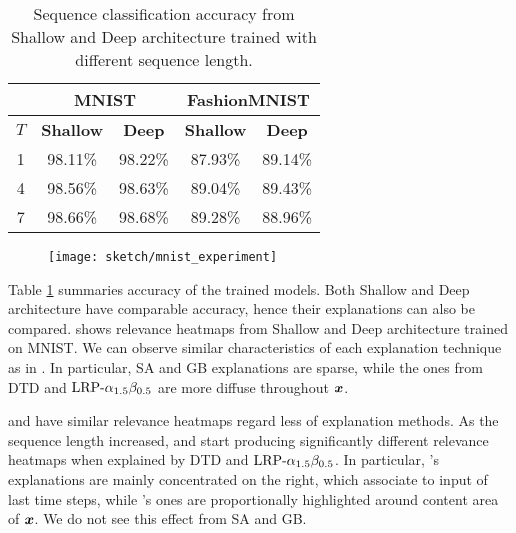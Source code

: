 \renewcommand{\arraystretch}{1.5}
\begin{table}[]
\centering
\begin{tabular}{cc|c|c|c|}
\cline{2-5}
& \multicolumn{2}{|c|}{\textbf{MNIST}} & \multicolumn{2}{|c|}{\textbf{FashionMNIST}} \\ \hline
\multicolumn{1}{|c|}{$T$}   & \multicolumn{1}{c|}{\textbf{Shallow}} & \multicolumn{1}{c|}{\textbf{Deep}} & \multicolumn{1}{c|}{\textbf{Shallow}} & \multicolumn{1}{c|}{\textbf{Deep}} \\ \hline
\multicolumn{1}{|c|}{1} & 98.11\%   & 98.22\% & 87.93\%  & 89.14\%                           \\
\multicolumn{1}{|c|}{4} & 98.56\% & 98.63\%  & 89.04\%  & 89.43\%                            \\
\multicolumn{1}{|c|}{7} & 98.66\%  & 98.68\% & 89.28\%  & 88.96\%  \\ \hline
\end{tabular}
\caption{Sequence classification accuracy from Shallow and Deep architecture trained with different sequence length.}
\label{tab:mnist_model_acc}
\end{table}
\renewcommand{\arraystretch}{1}



 \begin{figure}[!htb]
\centering
\texttt{[image: sketch/mnist\_experiment]}
\label{fig:mnist_experiment}
\end{figure}


Table \ref{tab:mnist_model_acc} summaries accuracy of the trained models. Both Shallow and Deep architecture have comparable accuracy, hence their explanations can also be compared. \addfigure{\ref{fig:mnist_experiment}} shows relevance heatmaps from Shallow and Deep architecture trained on MNIST.  We can observe similar characteristics of each explanation technique as in \addfigure{\ref{fig:lenet_heatmaps}}. In particular, SA and GB explanations are sparse, while the ones from DTD and $\text{LRP-}\alpha_{1.5}\beta_{0.5}$ are more diffuse throughout $\boldsymbol{x}$. 

  and  have similar relevance heatmaps regard less of explanation methods.  As the sequence length increased,  and   start producing significantly different relevance heatmaps when explained by DTD and $\text{LRP-}\alpha_{1.5}\beta_{0.5}$.  In particular,   's explanations are mainly concentrated on the right, which associate to input of last time steps, while  's ones are proportionally  highlighted around content area of $\boldsymbol{x}$. We do not see this effect from SA and GB.


